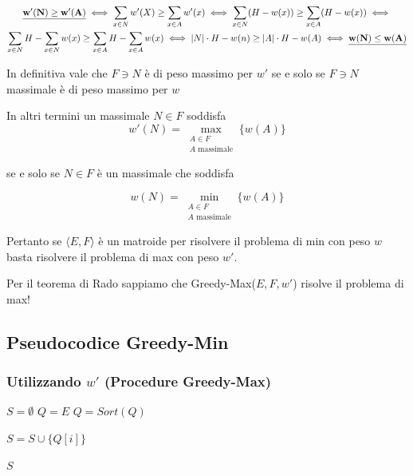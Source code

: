 \begin{gather*}
    \uline{\mathbf{w'(N) \geq w'(A)}} \iff 
    \sum_{x \in N} w'(X) \geq \sum_{x \in A} w'(x) \iff
    \sum_{x \in N} (H - w(x)) \geq \sum_{x \in A} (H - w(x)) \iff \\
    \sum_{x \in N} H - \sum_{x\in N} w(x) \geq \sum_{x \in A} H - \sum_{x \in A} w(x) \iff |N| \cdot H - w(n) \geq |A| \cdot H - w(A) \iff \uline{\mathbf{w(N) \leq w(A)}}
\end{gather*}

\begin{center}
    In definitiva vale che $F \ni N$ è di peso massimo per $w'$ se e solo se $F \ni N$ massimale è di peso massimo per $w$
\end{center}

\newpage
In altri termini un massimale $N \in F$ soddisfa
{
    \large
    $$
    w'(N) = \max_{\substack{A \in F \\ A \text{ massimale}}}\{w(A)\}
    $$
}
\begin{center}
    se e solo se $N \in F$ è un massimale che soddisfa
\end{center}
{
    \large
    $$
    w(N) = \min_{\substack{A \in F \\ A \text{ massimale}}}\{w(A)\}
    $$
}

Pertanto se $\langle E,F \rangle$ è un matroide per risolvere il problema di min con peso $w$ basta risolvere il problema di max con peso $w'$.

Per il teorema di Rado sappiamo che Greedy-Max($E,F,w'$) risolve il problema di max!

\subsection{Pseudocodice Greedy-Min}

\subsubsection{Utilizzando $w'$ (Procedure Greedy-Max)}
\begin{algorithmic}
        \State $S = \emptyset$
        \State $Q = E$
        \State $Q = Sort(Q)$ 

                \State $S = S \cup \{Q[i]\}$
            \EndIf
        \EndFor

        \State \Return $S$
    \EndProcedure
\end{algorithmic}

